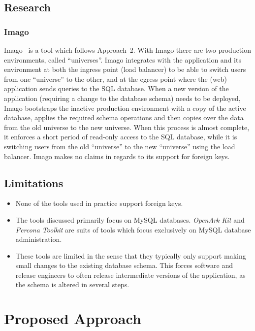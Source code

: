 \documentclass[conference]{IEEEtran}
\begin{document}
\subsection{Research}

\subsubsection{Imago}
Imago~\cite{Dumitras:2009:WUF:1656980.1657005} is a tool which follows Approach~2. With Imago there are two production environments, called ``universes''. Imago integrates with the application and its environment at both the ingress point (load balancer) to be able to switch users from one ``universe'' to the other, and at the egress point where the (web) application sends queries to the SQL database. When a new version of the application (requiring a change to the database schema) needs to be deployed, Imago bootstraps the inactive production environment with a copy of the active database, applies the required schema operations and then copies over the data from the old universe to the new universe. When this process is almost complete, it enforces a short period of read-only access to the SQL database, while it is switching users from the old ``universe'' to the new ``universe'' using the load balancer. Imago makes no claims in regards to its support for foreign keys.

\subsection{Limitations} 

\begin{itemize}
  \item None of the tools used in practice support foreign keys.
  \item The tools discussed primarily focus on MySQL databases. \textit{OpenArk Kit} and \textit{Percona Toolkit} are suits of tools which focus exclusively on MySQL database administration.
  \item These tools are limited in the sense that they typically only support making small changes to the existing database schema. This forces software and release engineers to often release intermediate versions of the application, as the schema is altered in several steps.
\end{itemize}

\section{Proposed Approach} %
\end{document}
